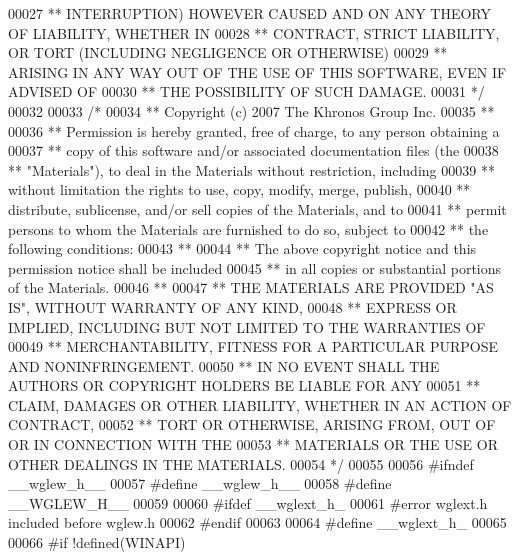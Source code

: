 \begin{DoxyCode}
00027 \textcolor{comment}{** INTERRUPTION) HOWEVER CAUSED AND ON ANY THEORY OF LIABILITY, WHETHER IN}
00028 \textcolor{comment}{** CONTRACT, STRICT LIABILITY, OR TORT (INCLUDING NEGLIGENCE OR OTHERWISE)}
00029 \textcolor{comment}{** ARISING IN ANY WAY OUT OF THE USE OF THIS SOFTWARE, EVEN IF ADVISED OF}
00030 \textcolor{comment}{** THE POSSIBILITY OF SUCH DAMAGE.}
00031 \textcolor{comment}{*/}
00032 
00033 \textcolor{comment}{/*}
00034 \textcolor{comment}{** Copyright (c) 2007 The Khronos Group Inc.}
00035 \textcolor{comment}{** }
00036 \textcolor{comment}{** Permission is hereby granted, free of charge, to any person obtaining a}
00037 \textcolor{comment}{** copy of this software and/or associated documentation files (the}
00038 \textcolor{comment}{** "Materials"), to deal in the Materials without restriction, including}
00039 \textcolor{comment}{** without limitation the rights to use, copy, modify, merge, publish,}
00040 \textcolor{comment}{** distribute, sublicense, and/or sell copies of the Materials, and to}
00041 \textcolor{comment}{** permit persons to whom the Materials are furnished to do so, subject to}
00042 \textcolor{comment}{** the following conditions:}
00043 \textcolor{comment}{** }
00044 \textcolor{comment}{** The above copyright notice and this permission notice shall be included}
00045 \textcolor{comment}{** in all copies or substantial portions of the Materials.}
00046 \textcolor{comment}{** }
00047 \textcolor{comment}{** THE MATERIALS ARE PROVIDED "AS IS", WITHOUT WARRANTY OF ANY KIND,}
00048 \textcolor{comment}{** EXPRESS OR IMPLIED, INCLUDING BUT NOT LIMITED TO THE WARRANTIES OF}
00049 \textcolor{comment}{** MERCHANTABILITY, FITNESS FOR A PARTICULAR PURPOSE AND NONINFRINGEMENT.}
00050 \textcolor{comment}{** IN NO EVENT SHALL THE AUTHORS OR COPYRIGHT HOLDERS BE LIABLE FOR ANY}
00051 \textcolor{comment}{** CLAIM, DAMAGES OR OTHER LIABILITY, WHETHER IN AN ACTION OF CONTRACT,}
00052 \textcolor{comment}{** TORT OR OTHERWISE, ARISING FROM, OUT OF OR IN CONNECTION WITH THE}
00053 \textcolor{comment}{** MATERIALS OR THE USE OR OTHER DEALINGS IN THE MATERIALS.}
00054 \textcolor{comment}{*/}
00055 
00056 \textcolor{preprocessor}{#ifndef \_\_wglew\_h\_\_}
00057 \textcolor{preprocessor}{#define \_\_wglew\_h\_\_}
00058 \textcolor{preprocessor}{#define \_\_WGLEW\_H\_\_}
00059 
00060 \textcolor{preprocessor}{#ifdef \_\_wglext\_h\_}
00061 \textcolor{preprocessor}{#error wglext.h included before wglew.h}
00062 \textcolor{preprocessor}{#endif}
00063 
00064 \textcolor{preprocessor}{#define \_\_wglext\_h\_}
00065 
00066 \textcolor{preprocessor}{#if !defined(WINAPI)}

\end{DoxyCode}
